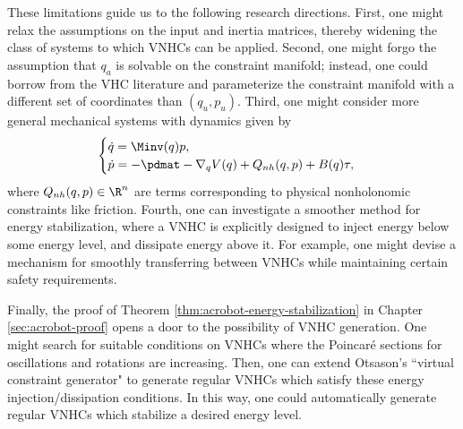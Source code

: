 These limitations guide us to the following research directions. 
First, one might relax the assumptions on the input and inertia
matrices, thereby widening the class of systems to which VNHCs can be applied.
Second, one might forgo the assumption that \(q_a\) is solvable on the
constraint manifold; instead, one could borrow from the VHC literature
and parameterize the constraint manifold with a different set of
coordinates than \((q_u,p_u)\).
Third, one might consider more general mechanical systems with dynamics given by
\[
    \begin{cases}
        \dot{q} = \Minv(q) p
        , \\
        \dot{p} = -\pdmat - \nabla_q V(q) + Q_{nh}(q,p) + B(q)\tau
        ,
    \end{cases}
\]
where \(Q_{nh}(q,p) \in \R^n\) are terms corresponding to physical nonholonomic
constraints like friction.
Fourth, one can investigate a smoother method for energy stabilization, where
a VNHC is explicitly designed to inject energy below some energy level, and
dissipate energy above it.
For example, one might devise a mechanism for smoothly transferring
between VNHCs while maintaining certain safety requirements.

Finally, the proof of Theorem \ref{thm:acrobot-energy-stabilization} 
in Chapter \ref{sec:acrobot-proof} opens a door to the possibility of VNHC generation. 
One might search for suitable conditions on VNHCs where the Poincar\'{e}
sections for oscillations and rotations are increasing.
Then, one can extend Otsason's ``virtual constraint
generator" \cite{vcg} to generate regular VNHCs which satisfy
these energy injection/dissipation conditions.
In this way, one could automatically generate regular VNHCs which stabilize a
desired energy level.

